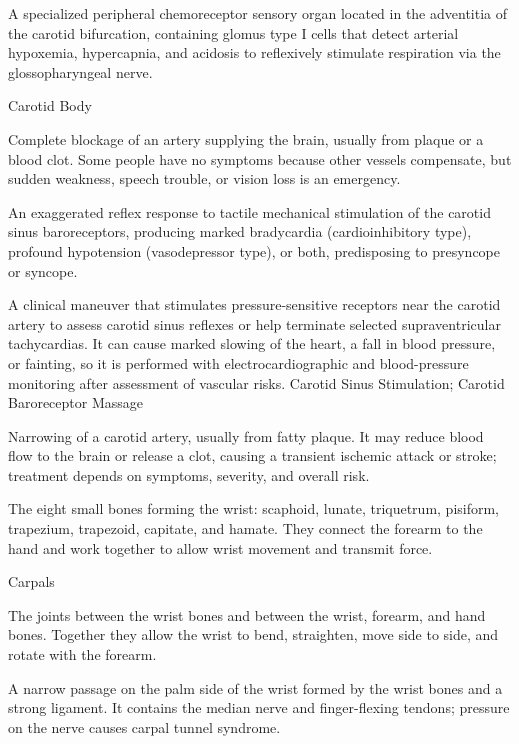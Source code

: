  A specialized peripheral chemoreceptor sensory organ located in the adventitia of the carotid bifurcation, containing glomus type I cells that detect arterial hypoxemia, hypercapnia, and acidosis to reflexively stimulate respiration via the glossopharyngeal nerve.

\synonyms
Carotid Body

 Complete blockage of an artery supplying the brain, usually from plaque or a blood clot. Some people have no symptoms because other vessels compensate, but sudden weakness, speech trouble, or vision loss is an emergency.

 An exaggerated reflex response to tactile mechanical stimulation of the carotid sinus baroreceptors, producing marked bradycardia (cardioinhibitory type), profound hypotension (vasodepressor type), or both, predisposing to presyncope or syncope.


 A clinical maneuver that stimulates pressure-sensitive receptors near the carotid artery to assess carotid sinus reflexes or help terminate selected supraventricular tachycardias. It can cause marked slowing of the heart, a fall in blood pressure, or fainting, so it is performed with electrocardiographic and blood-pressure monitoring after assessment of vascular risks.
\synonyms
Carotid Sinus Stimulation; Carotid Baroreceptor Massage

 Narrowing of a carotid artery, usually from fatty plaque. It may reduce blood flow to the brain or release a clot, causing a transient ischemic attack or stroke; treatment depends on symptoms, severity, and overall risk.

 The eight small bones forming the wrist: scaphoid, lunate, triquetrum, pisiform, trapezium, trapezoid, capitate, and hamate. They connect the forearm to the hand and work together to allow wrist movement and transmit force.

\synonyms
Carpals

 The joints between the wrist bones and between the wrist, forearm, and hand bones. Together they allow the wrist to bend, straighten, move side to side, and rotate with the forearm.

 A narrow passage on the palm side of the wrist formed by the wrist bones and a strong ligament. It contains the median nerve and finger-flexing tendons; pressure on the nerve causes carpal tunnel syndrome.

